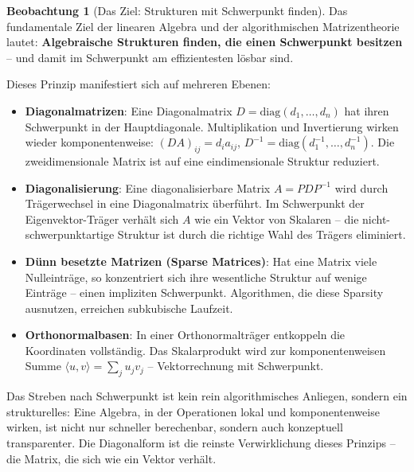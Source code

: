 ﻿\documentclass[a4paper,12pt]{report}
\theoremstyle{definition}
\newtheorem{beobachtung}{Beobachtung}
\begin{document}
\begin{beobachtung}[Das Ziel: Strukturen mit Schwerpunkt finden]
    Das fundamentale Ziel der linearen Algebra und der algorithmischen
    Matrizentheorie lautet: \textbf{Algebraische Strukturen finden, die
    einen Schwerpunkt besitzen} -- und damit im Schwerpunkt am
    effizientesten lösbar sind.

    Dieses Prinzip manifestiert sich auf mehreren Ebenen:
    \begin{itemize}
        \item[-] \textbf{Diagonalmatrizen}: Eine Diagonalmatrix
              $D = \mathrm{diag}(d_1, \dots, d_n)$ hat ihren Schwerpunkt
              in der Hauptdiagonale. Multiplikation und Invertierung
              wirken wieder komponentenweise: $(DA)_{ij} = d_i a_{ij}$,
              $D^{-1} = \mathrm{diag}(d_1^{-1}, \dots, d_n^{-1})$.
              Die zweidimensionale Matrix ist auf eine eindimensionale
              Struktur reduziert.
        \item[-] \textbf{Dia\-go\-nali\-sie\-rung}: Eine diagonalisierbare Matrix
              $A = PDP^{-1}$ wird durch Träger\-wechsel in eine Diagonalmatrix
              überführt. Im Schwerpunkt der Eigenvektor-Träger verhält sich $A$
              wie ein Vektor von Skalaren -- die nicht-schwerpunkt\-artige Struktur
              ist durch die richtige Wahl des Trägers eliminiert.
        \item[-] \textbf{Dünn besetzte Matrizen (Sparse Matrices)}: Hat
              eine Matrix viele Nulleinträge, so konzentriert sich ihre
              wesentliche Struktur auf wenige Einträge -- einen impliziten
              Schwerpunkt. Algorithmen, die diese Sparsity ausnutzen,
              erreichen subkubische Laufzeit.
        \item[-] \textbf{Orthonormalbasen}: In einer Orthonormalträger
              entkoppeln die Koordinaten vollständig. Das Skalarprodukt
              wird zur komponentenweisen Summe $\langle u, v \rangle =
              \sum_j u_j v_j$ -- Vektorrechnung mit Schwerpunkt.
    \end{itemize}

    Das Streben nach Schwerpunkt ist kein rein algorithmisches Anliegen,
    sondern ein strukturelles: Eine Algebra, in der Operationen lokal
    und komponentenweise wirken, ist nicht nur schneller berechenbar,
    sondern auch konzeptuell transparenter. Die Diagonalform ist die
    reinste Verwirklichung dieses Prinzips -- die Matrix, die sich
    wie ein Vektor verhält.
\end{beobachtung}
\end{document}
